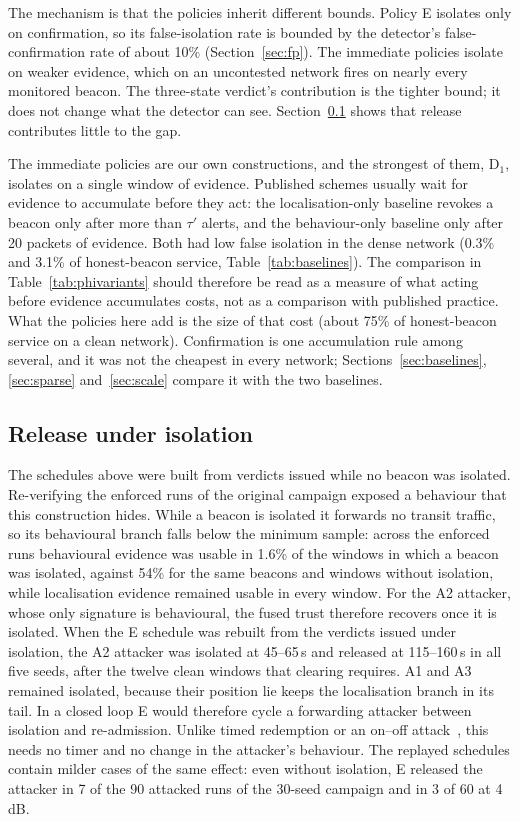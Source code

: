 The mechanism is that the policies inherit different bounds. Policy E isolates
only on confirmation, so its false-isolation rate is bounded by the detector's
false-confirmation rate of about 10\% (Section~\ref{sec:fp}). The immediate
policies isolate on weaker evidence, which on an uncontested network fires on
nearly every monitored beacon. The three-state verdict's contribution is the
tighter bound; it does not change what the detector can see.
Section~\ref{sec:release} shows that release contributes little to the gap.

The immediate policies are our own constructions, and the strongest of them,
D$_1$, isolates on a single window of evidence. Published schemes usually
wait for evidence to accumulate before they act: the localisation-only
baseline revokes a beacon only after more than $\tau'$ alerts, and the
behaviour-only baseline only after 20 packets of evidence. Both had low false
isolation in the dense network (0.3\% and 3.1\% of honest-beacon service,
Table~\ref{tab:baselines}). The comparison in Table~\ref{tab:phivariants} should
therefore be read as a measure of what acting before evidence accumulates
costs, not as a comparison with published practice. What the policies here
add is the size of that cost (about 75\% of honest-beacon service on a clean
network). Confirmation is one accumulation rule among several, and it was not
the cheapest in every network; Sections~\ref{sec:baselines},
\ref{sec:sparse} and~\ref{sec:scale} compare it with the two baselines.

\subsection{Release under isolation}
\label{sec:release}

The schedules above were built from verdicts issued while no beacon was
isolated. Re-verifying the enforced runs of the original campaign exposed a
behaviour that this construction hides. While a beacon is isolated it
forwards no transit traffic, so its behavioural branch falls below the
minimum sample: across the enforced runs behavioural evidence was usable in
1.6\% of the windows in which a beacon was isolated, against 54\% for the same
beacons and windows without isolation, while localisation evidence remained
usable in every window. For the A2 attacker, whose only signature is
behavioural, the fused trust therefore recovers once it is isolated. When the
E schedule was rebuilt from the verdicts issued under isolation, the A2
attacker was isolated at 45--65\,s and released at 115--160\,s in all five
seeds, after the twelve clean windows that clearing requires. A1 and A3
remained isolated, because their position lie keeps the localisation branch
in its tail. In a closed loop E would therefore cycle a forwarding attacker
between isolation and re-admission. Unlike timed redemption or an on--off
attack~\cite{bansal2003ocean,sun2006attacks}, this needs no timer and no
change in the attacker's behaviour. The replayed schedules contain milder
cases of the same effect: even without isolation, E released the attacker in
7 of the 90 attacked runs of the 30-seed campaign and in 3 of 60 at 4\,dB.

